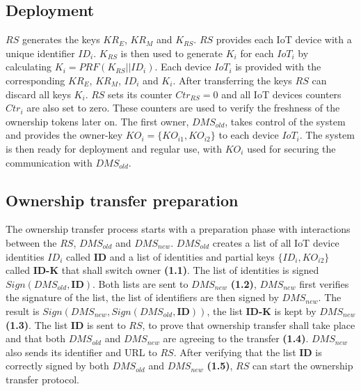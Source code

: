 {\subsection{Deployment}


$RS$ generates the keys $KR_E$, $KR_M$ and $K_{RS}$. $RS$ provides each IoT device with a unique identifier $ID_i$. $K_{RS}$ is then used to generate $K_i$ for each $IoT_i$ by calculating $K_i = PRF(K_{RS} || ID_i)$. Each device $IoT_i$ is provided with the corresponding $KR_E$, $KR_M$, $ID_i$ and $K_i$. After transferring the keys $RS$ can discard all keys $K_i$. $RS$ sets its counter $Ctr_{RS} = 0$ and all IoT devices counters $Ctr_i$ are also set to zero. These counters are used to verify the freshness of the ownership tokens later on.
The first owner, $DMS_{old}$, takes control of the system and provides the owner-key $KO_i = \{KO_{i1}, KO_{i2}\}$ to each device $IoT_i$. The system is then ready for deployment and regular use, with $KO_i$ used for securing the communication with $DMS_{old}$. 

\subsection{Ownership transfer preparation}
The ownership transfer process starts with a preparation phase with interactions between the $RS$, $DMS_{old}$ and $DMS_{new}$. $DMS_{old}$ creates a list of all IoT device identities $ID_i$ called \textbf{ID} and a list of identities and partial keys $\{ID_i, KO_{i2} \}$ called \textbf{ID-K} that shall switch owner \textbf{(1.1)}. The list of identities is signed $Sign(DMS_{old}, \mathbf{ID})$. Both lists are sent to $DMS_{new}$ \textbf{(1.2)}, $DMS_{new}$ first verifies the signature of the list, the list of identifiers are then signed by $DMS_{new}$. The result is $Sign(DMS_{new}, Sign(DMS_{old}, \mathbf{ID}))$, the list \textbf{ID-K} is kept by $DMS_{new}$ \textbf{(1.3)}. The list \textbf{ID} is sent to $RS$, to prove that ownership transfer shall take place and that both $DMS_{old}$ and $DMS_{new}$ are agreeing to the transfer \textbf{(1.4)}. $DMS_{new}$ also sends its identifier and URL to $RS$.
After verifying that the list \textbf{ID} is correctly signed by both $DMS_{old}$ and $DMS_{new}$ \textbf{(1.5)}, $RS$ can start the ownership transfer protocol. 

}

